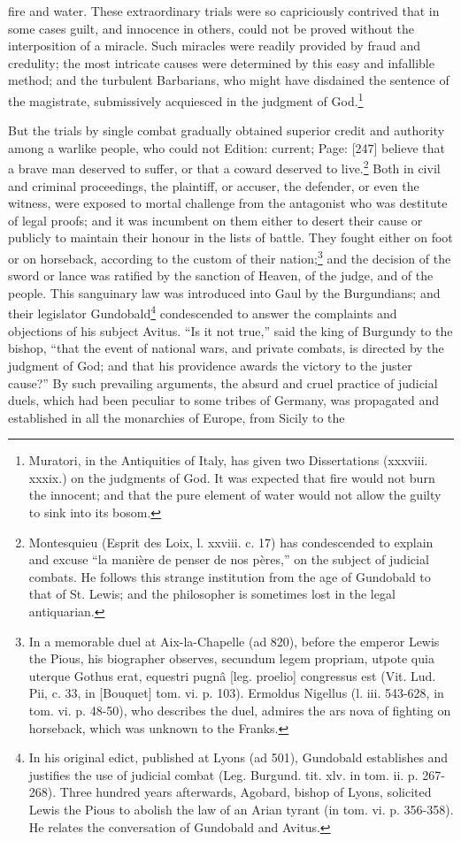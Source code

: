 fire and water. These extraordinary trials were so capriciously contrived that in some cases guilt, and innocence in others, could not be proved without the interposition of a miracle. Such miracles were readily provided by fraud and credulity; the most intricate causes were determined by this easy and infallible method; and the turbulent Barbarians, who might have disdained the sentence of the magistrate, submissively acquiesced in the judgment of God.\footnote{Muratori, in the Antiquities of Italy, has given two Dissertations (xxxviii. xxxix.) on the judgments of God. It was expected that fire would not burn the innocent; and that the pure element of water would not allow the guilty to sink into its bosom.}

But the trials by single combat gradually obtained superior credit and authority among a warlike people, who could not Edition: current; Page: [247] believe that a brave man deserved to suffer, or that a coward deserved to live.\footnote{Montesquieu (Esprit des Loix, l. xxviii. c. 17) has condescended to explain and excuse \texthebrew{“}la manière de penser de nos pères,\texthebrew{}” on the subject of judicial combats. He follows this strange institution from the age of Gundobald to that of St. Lewis; and the philosopher is sometimes lost in the legal antiquarian.} Both in civil and criminal proceedings, the plaintiff, or accuser, the defender, or even the witness, were exposed to mortal challenge from the antagonist who was destitute of legal proofs; and it was incumbent on them either to desert their cause or publicly to maintain their honour in the lists of battle. They fought either on foot or on horseback, according to the custom of their nation;\footnote{In a memorable duel at Aix-la-Chapelle (ad 820), before the emperor Lewis the Pious, his biographer observes, secundum legem propriam, utpote quia uterque Gothus erat, equestri pugnâ [leg. proelio] congressus est (Vit. Lud. Pii, c. 33, in [Bouquet] tom. vi. p. 103). Ermoldus Nigellus (l. iii. 543-628, in tom. vi. p. 48-50), who describes the duel, admires the ars nova of fighting on horseback, which was unknown to the Franks.} and the decision of the sword or lance was ratified by the sanction of Heaven, of the judge, and of the people. This sanguinary law was introduced into Gaul by the Burgundians; and their legislator Gundobald\footnote{In his original edict, published at Lyons (ad 501), Gundobald establishes and justifies the use of judicial combat (Leg. Burgund. tit. xlv. in tom. ii. p. 267-268). Three hundred years afterwards, Agobard, bishop of Lyons, solicited Lewis the Pious to abolish the law of an Arian tyrant (in tom. vi. p. 356-358). He relates the conversation of Gundobald and Avitus.} condescended to answer the complaints and objections of his subject Avitus. \texthebrew{“}Is it not true,\texthebrew{}” said the king of Burgundy to the bishop, \texthebrew{“}that the event of national wars, and private combats, is directed by the judgment of God; and that his providence awards the victory to the juster cause?\texthebrew{}” By such prevailing arguments, the absurd and cruel practice of judicial duels, which had been peculiar to some tribes of Germany, was propagated and established in all the monarchies of Europe, from Sicily to the 